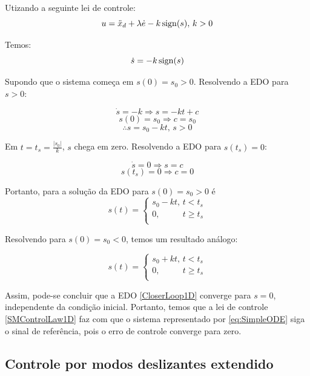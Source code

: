 \documentclass[a4paper,11pt,brazil,fleqn]{article}
\begin{document}
Utizando a seguinte lei de controle:
\begin{equation} \label{SMControlLaw1D}
u = \ddot{x}_d + \lambda \dot{e} - k \operatorname*{sign} (s), \, k>0
\end{equation}

Temos:
\begin{equation} \label{CloserLoop1D}
\dot{s} = -k \operatorname*{sign}(s) 
\end{equation}

Supondo que o sistema come\c{c}a em $s(0) = s_0 >0$. Resolvendo a EDO para $s>0$:

$$ \dot{s} = -k \Rightarrow s = -k t + c $$
$$ s(0) = s_0 \Rightarrow c = s_0 $$
$$ \therefore s = s_0 - k t, \, s>0 $$

Em $t = t_s = \frac{|s_0|}{k}$, $s$ chega em zero. Resolvendo a EDO para $s(t_s) = 0$:

$$ \dot{s} = 0 \Rightarrow s =  c $$
$$ s(t_s) = 0 \Rightarrow c = 0 $$

Portanto, para a solu\c{c}\~ao da EDO para $s(0) = s_0 > 0$ \'e
\begin{equation} \label{eq:SM-ODE-Sol1}
s(t) =
\begin{cases}
s_0 - k t, \, t < t_s \\
0, \,\,\,\,\,\,\,\,\,\,\,\,\,\,\,\, t \geq t_s \\
\end{cases}
\end{equation}

Resolvendo para $s(0) = s_0 < 0$, temos um resultado an\'alogo:

\begin{equation} \label{eq:SM-ODE-Sol2}
s(t) =
\begin{cases}
s_0 + k t, \, t < t_s \\
0, \,\,\,\,\,\,\,\,\,\,\,\,\,\,\,\, t \geq t_s \\
\end{cases}
\end{equation}

Assim, pode-se concluir que a EDO \eqref{CloserLoop1D} converge para $s=0$, independente da condi\c{c}\~ao inicial. Portanto, temos que a lei de controle \eqref{SMControlLaw1D} faz com que o sistema representado por \eqref{eq:SimpleODE} siga o sinal de refer\^encia, pois o erro de controle converge para zero.

\subsection{Controle por modos deslizantes extendido}\label{S04-7}
\end{document}
